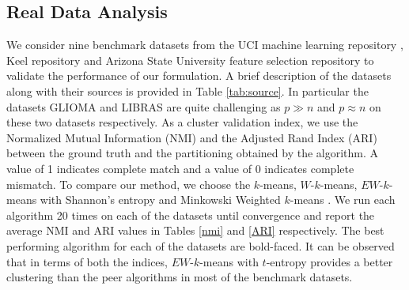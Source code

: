 \documentclass{article}
\begin{document}
\subsection{Real Data Analysis}
 We consider nine benchmark datasets from the UCI machine learning repository \citep{Dua:2019}, Keel repository \citep{alcala2011keel} and Arizona State University  feature selection repository \citep{li2018feature} to validate the performance of our formulation. A brief description of the datasets along with their sources is provided in Table \ref{tab:source}. In particular the datasets GLIOMA and LIBRAS are quite challenging as $p \gg n$ and $p \approx n $ on these two datasets respectively. As a cluster validation index, we use the Normalized Mutual Information (NMI) \citep{vinh2010information} and the Adjusted Rand Index (ARI) \citep{hubert1985comparing} between the ground truth and the partitioning obtained by the algorithm. A value of 1 indicates complete match and a value of 0 indicates complete mismatch.  To compare our method, we choose the $k$-means, $W$-$k$-means, $EW$-$k$-means with Shannon's entropy and  Minkowski Weighted $k$-means \citep{de2012minkowski}. We run each algorithm 20 times on each of the datasets until convergence and report the average NMI and ARI values in Tables \ref{nmi} and \ref{ARI} respectively. The best performing algorithm for each of the datasets are bold-faced. It can be observed that in terms of both the indices, $EW$-$k$-means with $t$-entropy provides a better clustering than the peer algorithms in most of the benchmark datasets.\par
\end{document}
